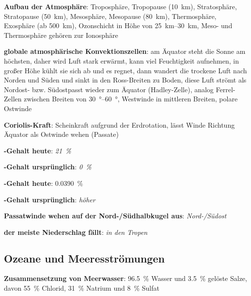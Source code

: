 \textbf{Aufbau der Atmosphäre}:
Troposphäre,
Tropopause (\SI{10}{\kilo\meter}),
Stratosphäre,\\
Stratopause (\SI{50}{\kilo\meter}),
Mesosphäre,
Mesopause (\SI{80}{\kilo\meter}),
Thermosphäre,
Exosphäre (ab \SI{500}{\kilo\meter}),
Ozonschicht in Höhe von \SIrange{25}{30}{\kilo\meter},
Meso- und Thermosphäre gehören zur Ionosphäre

\textbf{globale atmosphärische Konvektionszellen}:
am Äquator steht die Sonne am höchsten, daher wird Luft stark erwärmt,
kann viel Feuchtigkeit aufnehmen,
in großer Höhe kühlt sie sich ab und es regnet,
dann wandert die trockene Luft nach Norden und Süden und sinkt in den Ross-Breiten zu Boden,
diese Luft strömt als Nordost- bzw. Südostpasst wieder zum Äquator (Hadley-Zelle),
analog Ferrel-Zellen zwischen Breiten von \SIrange{30}{60}{\degree},
Westwinde in mittleren Breiten,
polare Ostwinde

\textbf{Coriolis-Kraft}:
Scheinkraft aufgrund der Erdrotation,
lässt Winde Richtung Äquator als Ostwinde wehen (Passate)

\begin{wichtig}
    \item
    \textbf{-Gehalt heute}:
    \emph{\SI[math-rm=\mathit,text-rm=\itshape]{21}{\percent}}

    \item
    \textbf{-Gehalt ursprünglich}:
    \emph{\SI[math-rm=\mathit,text-rm=\itshape]{0}{\percent}}

    \item
    \textbf{-Gehalt heute}:
    \SI[math-rm=\mathit,text-rm=\itshape]{0.0390}{\percent}

    \item
    \textbf{-Gehalt ursprünglich}:
    \emph{höher}

    \item
    \textbf{Passatwinde wehen auf der Nord-/Südhalbkugel aus}:
    \emph{Nord-/Südost}

    \item
    \textbf{der meiste Niederschlag fällt}:
    \emph{in den Tropen}
\end{wichtig}

\pagebreak

\subsection{%
    Ozeane und Meeresströmungen%
}

\textbf{Zusammensetzung von Meerwasser}:
\SI{96.5}{\percent} Wasser und
\SI{3.5}{\percent} gelöste Salze,
davon \SI{55}{\percent} Chlorid,
\SI{31}{\percent} Natrium und
\SI{8}{\percent} Sulfat

